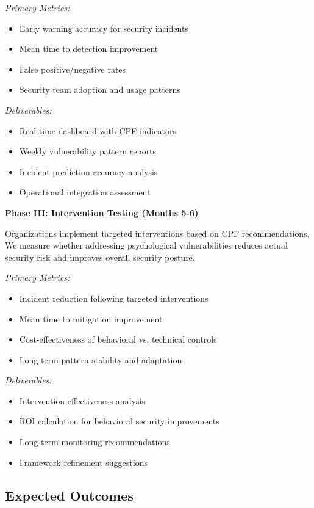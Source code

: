 \documentclass[11pt,a4paper]{article}
\begin{document}
\textit{Primary Metrics:}
\begin{itemize}
\item Early warning accuracy for security incidents
\item Mean time to detection improvement
\item False positive/negative rates
\item Security team adoption and usage patterns
\end{itemize}

\textit{Deliverables:}
\begin{itemize}
\item Real-time dashboard with CPF indicators
\item Weekly vulnerability pattern reports
\item Incident prediction accuracy analysis
\item Operational integration assessment
\end{itemize}

\textbf{Phase III: Intervention Testing (Months 5-6)}

Organizations implement targeted interventions based on CPF recommendations. We measure whether addressing psychological vulnerabilities reduces actual security risk and improves overall security posture.

\textit{Primary Metrics:}
\begin{itemize}
\item Incident reduction following targeted interventions
\item Mean time to mitigation improvement
\item Cost-effectiveness of behavioral vs. technical controls
\item Long-term pattern stability and adaptation
\end{itemize}

\textit{Deliverables:}
\begin{itemize}
\item Intervention effectiveness analysis
\item ROI calculation for behavioral security improvements
\item Long-term monitoring recommendations
\item Framework refinement suggestions
\end{itemize}

\subsection{Expected Outcomes}
\end{document}
